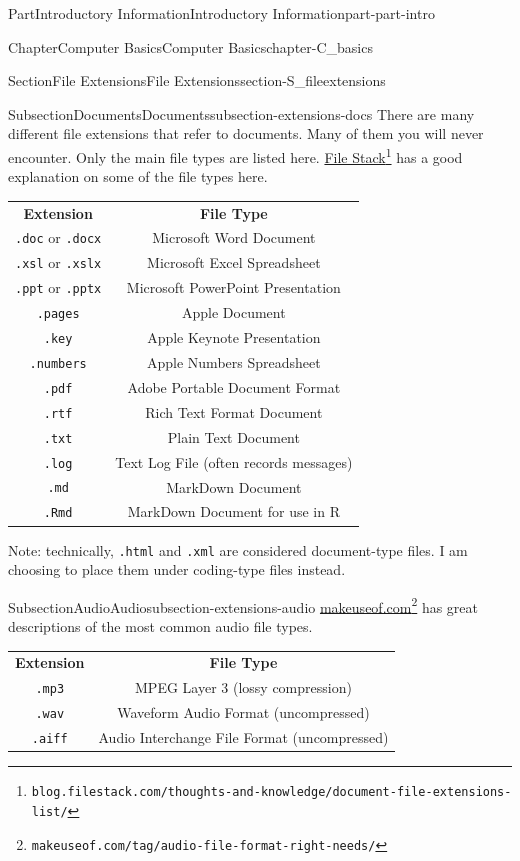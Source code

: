 \documentclass[twoside,10pt,]{book}
\newcommand{\tabularfont}{\relax}
\newcommand{\mono}[1]{\texttt{#1}}
\begin{document}
\begin{partptx}{Part}{Introductory Information}{}{Introductory Information}{}{}{part-part-intro}
\begin{chapterptx}{Chapter}{Computer Basics}{}{Computer Basics}{}{}{chapter-C_basics}
\begin{sectionptx}{Section}{File Extensions}{}{File Extensions}{}{}{section-S_fileextensions}
\begin{subsectionptx}{Subsection}{Documents}{}{Documents}{}{}{subsection-extensions-docs}
There are many different file extensions that refer to documents. Many of them you will never encounter. Only the main file types are listed here. \href{https://blog.filestack.com/thoughts-and-knowledge/document-file-extensions-list/}{File Stack}\footnote{\nolinkurl{blog.filestack.com/thoughts-and-knowledge/document-file-extensions-list/}\label{fn-extensions-docs-c-b}} has a good explanation on some of the file types here.%
\begin{center}%
{\tabularfont%
\begin{tabular}{cc}
{\bfseries{}Extension}&{\bfseries{}File Type}\tabularnewline[0pt]
\mono{.doc} or \mono{.docx}&Microsoft Word Document\tabularnewline[0pt]
\mono{.xsl} or \mono{.xslx}&Microsoft Excel Spreadsheet\tabularnewline[0pt]
\mono{.ppt} or \mono{.pptx}&Microsoft PowerPoint Presentation\tabularnewline[0pt]
\mono{.pages}&Apple Document\tabularnewline[0pt]
\mono{.key}&Apple Keynote Presentation\tabularnewline[0pt]
\mono{.numbers}&Apple Numbers Spreadsheet\tabularnewline[0pt]
\mono{.pdf}&Adobe Portable Document Format\tabularnewline[0pt]
\mono{.rtf}&Rich Text Format Document\tabularnewline[0pt]
\mono{.txt}&Plain Text Document\tabularnewline[0pt]
\mono{.log}&Text Log File (often records messages)\tabularnewline[0pt]
\mono{.md}&MarkDown Document\tabularnewline[0pt]
\mono{.Rmd}&MarkDown Document for use in R
\end{tabular}
}%
\end{center}%
Note: technically, \mono{.html} and \mono{.xml} are considered document-type files. I am choosing to place them under coding-type files instead.%
\end{subsectionptx}
%
%
\typeout{************************************************}
\typeout{************************************************}
%
\begin{subsectionptx}{Subsection}{Audio}{}{Audio}{}{}{subsection-extensions-audio}
%
\href{https://www.makeuseof.com/tag/audio-file-format-right-needs/}{makeuseof.com}\footnote{\nolinkurl{makeuseof.com/tag/audio-file-format-right-needs/}\label{fn-extensions-audio-c-b}} has great descriptions of the most common audio file types.%
\begin{center}%
{\tabularfont%
\begin{tabular}{cc}
{\bfseries{}Extension}&{\bfseries{}File Type}\tabularnewline[0pt]
\mono{.mp3}&MPEG Layer 3 (lossy compression)\tabularnewline[0pt]
\mono{.wav}&Waveform Audio Format (uncompressed)\tabularnewline[0pt]
\mono{.aiff}&Audio Interchange File Format (uncompressed)\tabularnewline[0pt]

\end{tabular}}
\end{center}
\end{subsectionptx}
\end{sectionptx}
\end{chapterptx}
\end{partptx}
\end{document}
